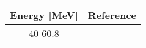 \begin{tabular}{|c||c|} 
    \hline 
    \bf{Energy [MeV]} & \bf{Reference} \\
    \hline
    \hline 
    40-60.8 & \cite{Menet71}\\
    \hline
\end{tabular}
